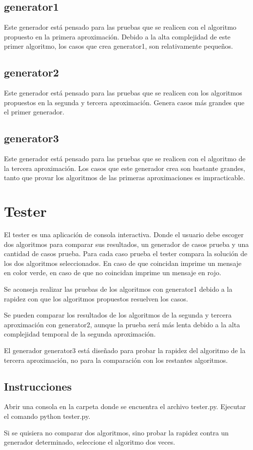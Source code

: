 \documentclass[article]{llncs}
\begin{document}
\subsection{generator1}
Este generador est\'a pensado para las pruebas que se realicen con el algoritmo 
propuesto en la primera aproximaci\'on. Debido a la alta complejidad de 
este primer algoritmo, los casos que crea generator1, son relativamente peque\~{n}os.

\subsection{generator2}
Este generador est\'a pensado para las pruebas que se realicen con los algoritmos 
propuestos en la segunda y tercera aproximaci\'on. Genera casos m\'as grandes 
que el primer generador.

\subsection{generator3}
Este generador est\'a pensado para las pruebas que se realicen con el 
algoritmo de la tercera aproximaci\'on. Los casos que este generador 
crea son bastante grandes, tanto que provar los algoritmos de las primeras 
aproximaciones es impracticable.

\section{Tester}

El tester es una aplicaci\'on de consola interactiva. Donde el usuario 
debe escoger dos algoritmos para comparar sus resultados, un generador 
de casos prueba y una cantidad de casos prueba. Para cada caso prueba 
el tester compara la soluci\'on de los dos algoritmos seleccionados. 
En caso de que coincidan imprime un mensaje en color verde, en caso 
de que no coincidan imprime un mensaje en rojo.

Se aconseja realizar las pruebas de los algoritmos con generator1 debido 
a la rapidez con que los algoritmos propuestos resuelven los casos.

Se pueden comparar los resultados de los algoritmos de la segunda y 
tercera aproximaci\'on con generator2, aunque la prueba ser\'a m\'as 
lenta debido a la alta complejidad temporal de la segunda aproximaci\'on.

El generador generator3 est\'a dise\~{n}ado para probar la rapidez del 
algoritmo de la tercera aproximaci\'on, no para la comparaci\'on con los 
restantes algoritmos.

\subsection{Instrucciones}

Abrir una consola en la carpeta donde se encuentra el archivo tester.py. 
Ejecutar el comando python tester.py.

Si se quisiera no comparar dos algoritmos, sino probar la rapidez contra un 
generador determinado, seleccione el algoritmo dos veces.
\end{document}
